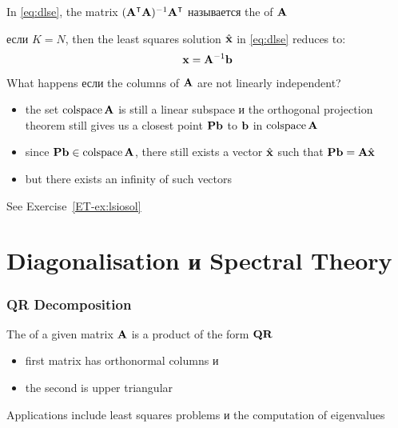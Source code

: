 \begin{frame}

    \vspace{2em}
    In  \eqref{eq:dlse}, the matrix $(\boldA^\T\boldA)^{-1} \boldA^\T$ 
    называется the  of $\mathbf A$ 
    
    \vspace{1em}
    если $K =
    N$, then the
    least squares solution $\hat {\mathbf x}$ in \eqref{eq:dlse} reduces to:
    \begin{equation*}
        {\mathbf x} = \mathbf A^{-1}{\mathbf b}
    \end{equation*}
    
\end{frame}

\begin{frame}

     \vspace{2em}
    What happens если the columns of $\mathbf A$ are not
    linearly independent? 
    
    \begin{itemize}
        \item   the set $\operatorname{colspace} \mathbf A$ is still a linear
        subspace и the orthogonal projection theorem still gives us a closest
        point $\mathbf P {\mathbf b}$ to ${\mathbf b}$ in $\operatorname{colspace} \mathbf A$
        \item   since $\mathbf P
        {\mathbf b} \in \operatorname{colspace} \mathbf A$, there still exists a vector $\hat {\mathbf x}$ such
        that $\mathbf P {\mathbf b} = \mathbf A \hat {\mathbf x}$
        \item    but there
        exists an infinity of such vectors
    \end{itemize}
    
    See Exercise~\ref{ET-ex:lsiosol}
    
\end{frame}


\section{Diagonalisation и Spectral Theory} 

\begin{frame}\frametitle{QR Decomposition}

     \vspace{2em}
    The  of a given matrix $\mathbf A$ is a product of the form $\mathbf Q \mathbf R$
    \begin{itemize}
        \item first matrix has orthonormal columns и 
        \item the second is upper triangular
    \end{itemize}
    
    \vspace{1em}
    Applications include least squares problems и the computation of eigenvalues
    
\end{frame}

